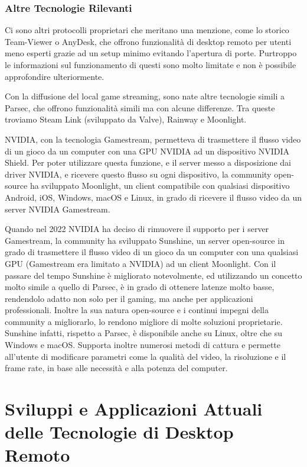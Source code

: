\documentclass[12pt,a4paper,openright,twoside]{book}
\begin{document}
\subsection{Altre Tecnologie Rilevanti}
Ci sono altri protocolli proprietari che meritano una menzione, come lo storico Team-Viewer o AnyDesk, che offrono funzionalità di desktop remoto per utenti meno esperti grazie ad un setup minimo evitando l'apertura di porte. Purtroppo le informazioni sul funzionamento di questi sono molto limitate e non è possibile approfondire ulteriormente.

Con la diffusione del local game streaming, sono nate altre tecnologie simili a Parsec, che offrono funzionalità simili ma con alcune differenze. Tra queste troviamo Steam Link (sviluppato da Valve), Rainway e Moonlight.

NVIDIA, con la tecnologia Gamestream, permetteva di trasmettere il flusso video di un gioco da un computer con una GPU NVIDIA ad un dispositivo NVIDIA Shield. Per poter utilizzare questa funzione, e il server messo a disposizione dai driver NVIDIA, e ricevere questo flusso su ogni dispositivo, la community open-source ha sviluppato Moonlight, un client compatibile con qualsiasi dispositivo Android, iOS, Windows, macOS e Linux, in grado di ricevere il flusso video da un server NVIDIA Gamestream.

Quando nel 2022 NVIDIA ha deciso di rimuovere il supporto per i server Gamestream, la community ha sviluppato Sunshine, un server open-source in grado di trasmettere il flusso video di un gioco da un computer con una qualsiasi GPU (Gamestream era limitato a NVIDIA) ad un client Moonlight.
Con il passare del tempo Sunshine è migliorato notevolmente, ed utilizzando un concetto molto simile a quello di Parsec, è in grado di ottenere latenze molto basse, rendendolo adatto non solo per il gaming, ma anche per applicazioni professionali. Inoltre la sua natura open-source e i continui impegni della community a migliorarlo, lo rendono migliore di molte soluzioni proprietarie. Sunshine infatti, rispetto a Parsec, è disponibile anche su Linux, oltre che su Windows e macOS. Supporta inoltre numerosi metodi di cattura e permette all'utente di modificare parametri come la qualità del video, la risoluzione e il frame rate, in base alle necessità e alla potenza del computer.

\chapter{Sviluppi e Applicazioni Attuali delle Tecnologie di Desktop Remoto}
\label{chap:current-applications}
\end{document}
